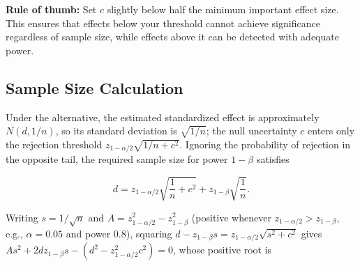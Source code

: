 \documentclass[
  11pt,
  letterpaper,
]{article}
\begin{document}
\begin{table}

\caption{\label{tbl-guidelines}Recommended uncertainty parameter \(c\)
based on minimum important effect size. The Example column gives
illustrative examples only.}


\end{table}%

\textbf{Rule of thumb:} Set \(c\) slightly below half the minimum
important effect size. This ensures that effects below your threshold
cannot achieve significance regardless of sample size, while effects
above it can be detected with adequate power.

\subsection{Sample Size Calculation}\label{sec-samplesize}

Under the alternative, the estimated standardized effect is
approximately \(N(d, 1/n)\), so its standard deviation is
\(\sqrt{1/n}\); the null uncertainty \(c\) enters only the rejection
threshold \(z_{1-\alpha/2}\sqrt{1/n + c^2}\). Ignoring the probability
of rejection in the opposite tail, the required sample size for power
\(1-\beta\) satisfies

\[d = z_{1-\alpha/2}\sqrt{\frac{1}{n} + c^2} + z_{1-\beta}\sqrt{\frac{1}{n}}.\]

Writing \(s = 1/\sqrt{n}\) and \(A = z_{1-\alpha/2}^2 - z_{1-\beta}^2\)
(positive whenever \(z_{1-\alpha/2} > z_{1-\beta}\), e.g.,
\(\alpha = 0.05\) and power 0.8), squaring
\(d - z_{1-\beta}s = z_{1-\alpha/2}\sqrt{s^2 + c^2}\) gives
\(A s^2 + 2 d z_{1-\beta} s - (d^2 - z_{1-\alpha/2}^2 c^2) = 0\), whose
positive root is
\end{document}
